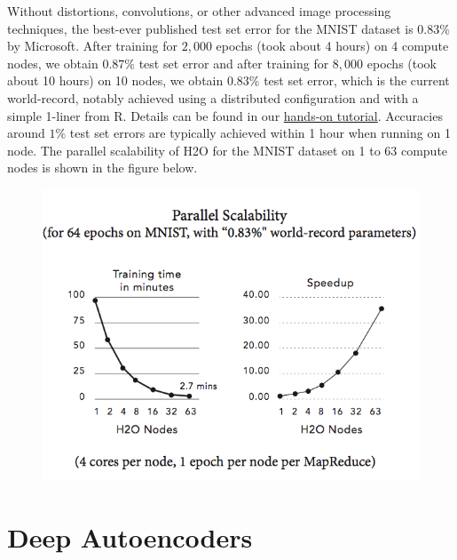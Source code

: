 Without distortions, convolutions, or other advanced image processing techniques, the best-ever published test set error for the MNIST dataset is $0.83$\% by Microsoft. After training for $2,000$ epochs (took about 4 hours) on 4 compute nodes, we obtain $0.87\%$ test set error and after training for $8,000$ epochs (took about 10 hours) on 10 nodes, we obtain $0.83\%$ test set error, which is the current world-record, notably achieved using a distributed configuration and with a simple 1-liner from R. Details can be found in our \href{http://learn.h2o.ai/content/hands-on_training/deep_learning.html}{hands-on tutorial}. Accuracies around $1\%$ test set errors are typically achieved within 1 hour when running on 1 node.
The parallel scalability of H2O for the MNIST dataset on 1 to 63 compute nodes is shown in the figure below.
\begin{figure}[h!]
\centering
\includegraphics{scalability_new.png}
\end{figure}
\bigskip
\bigskip
\bigskip
\section{Deep Autoencoders}
\label{sec:DeepAutoencoders}  

